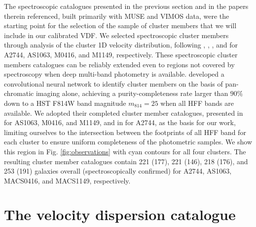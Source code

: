 \documentclass{aa}
\begin{document}
The spectroscopic catalogues presented in the previous section and in the papers therein referenced, built primarily with MUSE and VIMOS data, were the starting point for the selection of the sample of cluster members that we will include in our calibrated VDF. We selected spectroscopic cluster members through analysis of the cluster 1D velocity distribution, following \citet{bergamini23}, \citet{caminha16}, \citet{caminha17a}, and \citet{grillo16} for A2744, AS1063, M0416, and M1149, respectively.  These spectroscopic cluster members catalogues can be reliably extended even to regions not covered by spectroscopy when deep multi-band photometry is available. \cite{angora20} developed a convolutional neural network to identify cluster members on the basis of pan-chromatic imaging alone, achieving a purity-completeness rate larger than $90\%$ down to a HST F814W band magnitude $m_{814}=25$ when all HFF bands are available. We adopted their completed cluster member catalogues, presented in \cite{angora20} for AS1063, M0416, and M1149, and in \cite{bergamini23} for A2744, as the basis for our work, limiting ourselves to the intersection between the footprints of all HFF band for each cluster to ensure uniform completeness of the photometric samples. We show this region in Fig. \ref{fig:observations} with cyan contours for all four clusters. The resulting cluster member catalogues contain 221 (177), 221 (146), 218 (176), and 253 (191) galaxies overall (spectroscopically confirmed) for A2744, AS1063, MACS0416, and MACS1149, respectively.



\section{The velocity dispersion catalogue}\label{s3}
\end{document}
